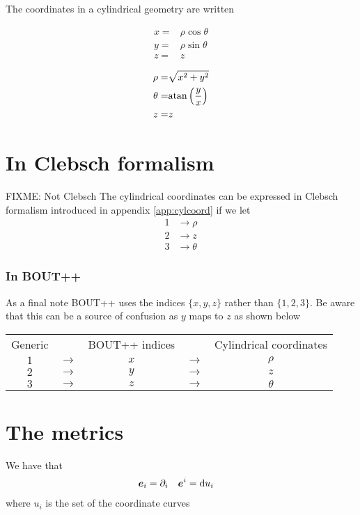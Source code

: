 The coordinates in a cylindrical geometry are written\\
%
\begin{minipage}{0.4\textwidth}
\begin{align*}
    x=&\rho \cos\theta\\
    y=&\rho \sin\theta\\
    z=& z
\end{align*}
\end{minipage}
\hfill
\begin{minipage}{0.4\textwidth}
\begin{align*}
    \rho=& \sqrt{x^2+y^2}\\
    \theta=&\text{atan}\left(\frac{y}{x}\right)\\
    z=& z
\end{align*}
\end{minipage}

\section{In Clebsch formalism}
%
FIXME: Not Clebsch
The cylindrical coordinates can be expressed in Clebsch formalism introduced in appendix \ref{app:cylcoord} if we let
%
\begin{align*}
    1 &\to \rho\\
    2 &\to z\\
    3 &\to \theta
\end{align*}
%

\subsubsection{In BOUT++}
%
As a final note BOUT++ uses the indices $\{x,y,z\}$ rather than $\{1,2,3\}$.
Be aware that this can be a source of confusion as $y$ maps to $z$ as shown below
%
\begin{center}
    \begin{tabular}{ccccc}
        Generic &     & BOUT++ indices &     & Cylindrical coordinates\\
        $1$     &$\to$& $x$            &$\to$& $\rho$                 \\
        $2$     &$\to$& $y$            &$\to$& $z$                    \\
        $3$     &$\to$& $z$            &$\to$& $\theta$
    \end{tabular}
\end{center}
%

\section{The metrics}
\label{sec:metr}
%
We have that
%
\begin{align*}
    &\boldsymbol{e}_i = \partial_i&
    &\boldsymbol{e}^i = \text{d} u_i&
\end{align*}
%
where $u_i$ is the set of the coordinate curves

